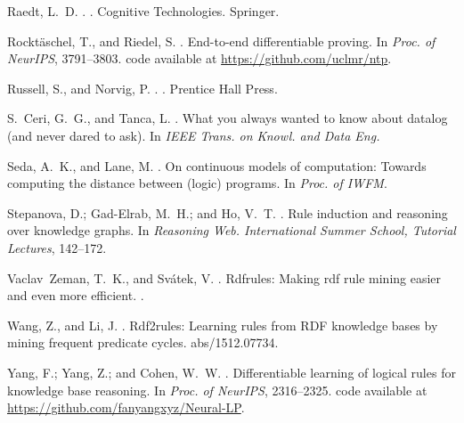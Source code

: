\documentclass[letterpaper]{article} \usepackage{aaai20}  \usepackage{times}  \usepackage{helvet} \usepackage{courier}  \usepackage[hyphens]{url}  \usepackage{graphicx} \urlstyle{rm} \def\UrlFont{\rm}  \usepackage{graphicx}  \frenchspacing  \setlength{\pdfpagewidth}{8.5in}  \setlength{\pdfpageheight}{11in}  \usepackage{amsthm}
\theoremstyle{definition}
\begin{document}
\begin{thebibliography}{}
Raedt, L.~D.
.
.
\newblock Cognitive Technologies. Springer.

Rockt{\"{a}}schel, T., and Riedel, S.
.
\newblock End-to-end differentiable proving.
\newblock In {\em Proc. of NeurIPS},  3791--3803.
\newblock code available at \url{https://github.com/uclmr/ntp}.

Russell, S., and Norvig, P.
.
.
\newblock Prentice Hall Press.

S.~Ceri, G.~G., and Tanca, L.
.
\newblock What you always wanted to know about datalog (and never dared to
  ask).
\newblock In {\em IEEE Trans. on Knowl. and Data Eng.}

Seda, A.~K., and Lane, M.
.
\newblock On continuous models of computation: Towards computing the distance
  between (logic) programs.
\newblock In {\em Proc. of IWFM}.

Stepanova, D.; Gad{-}Elrab, M.~H.; and Ho, V.~T.
.
\newblock Rule induction and reasoning over knowledge graphs.
\newblock In {\em Reasoning Web. International Summer School, Tutorial
  Lectures},  142--172.

Vaclav~Zeman, T.~K., and Svátek, V.
.
\newblock Rdfrules: Making rdf rule mining easier and even more efficient.
.

Wang, Z., and Li, J.
.
\newblock Rdf2rules: Learning rules from {RDF} knowledge bases by mining
  frequent predicate cycles.
 abs/1512.07734.

Yang, F.; Yang, Z.; and Cohen, W.~W.
.
\newblock Differentiable learning of logical rules for knowledge base
  reasoning.
\newblock In {\em Proc. of NeurIPS},  2316--2325.
\newblock code available at \url{https://github.com/fanyangxyz/Neural-LP}.

\end{thebibliography}
\end{document}
